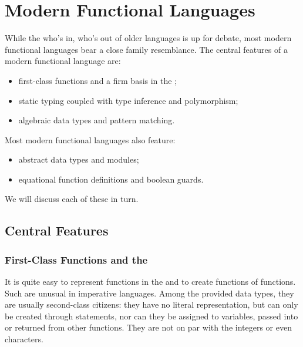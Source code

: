 \section{Modern Functional Languages}
While the who's in, who's out of older languages is up for debate, most modern functional languages bear a close family resemblance. The central features of a modern functional language are:
\begin{itemize}
\item
first-class functions and a firm basis in the \lambdacalc;
\item
static typing coupled with type inference and polymorphism;
\item
algebraic data types and pattern matching.
\end{itemize}
Most modern functional languages also feature:
\begin{itemize}
\item
abstract data types and modules;
\item
equational function definitions and boolean guards.
\end{itemize}
We will discuss each of these in turn.

\subsection{Central Features}
\subsubsection{First-Class Functions and the \LambdaCalc}
It is quite easy to represent functions in the \lambdacalc and to create functions of functions. Such  are unusual in imperative languages. Among the provided data types, they are usually second-class citizens: they have no literal representation, but can only be created through statements, nor can they be assigned to variables, passed into or returned from other functions. They are not on par with the integers or even characters.

